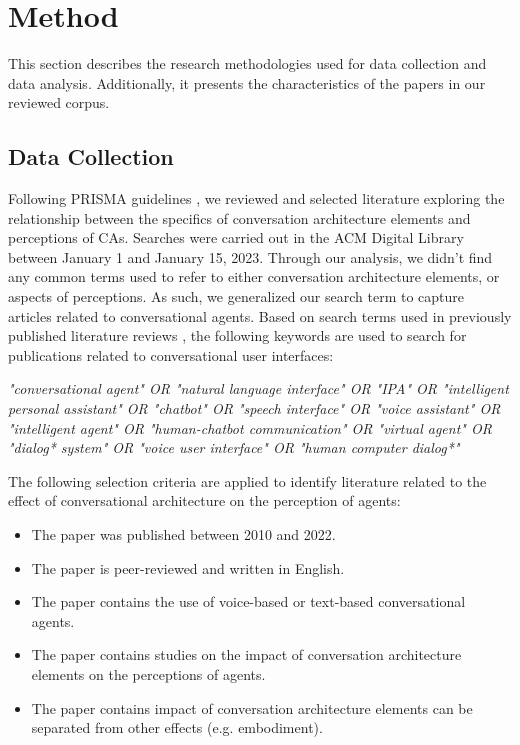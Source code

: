 
\section{Method}

This section describes the research methodologies used for data collection and data analysis. Additionally, it presents the characteristics of the papers in our reviewed corpus.

\subsection{Data Collection}

Following PRISMA guidelines \cite{prisma}, we reviewed and selected literature exploring the relationship between the specifics of conversation architecture elements and perceptions of CAs. Searches were carried out in the ACM Digital Library between January 1 and January 15, 2023. Through our analysis, we didn't find any common terms used to refer to either conversation architecture elements, or aspects of perceptions. As such, we generalized our search term to capture articles related to conversational agents. Based on search terms used in previously published literature reviews \cite{clark2019state, rapp2021human}, the following keywords are used to search for publications related to conversational user interfaces:
\newline

\textit{"conversational agent" OR "natural language interface" OR "IPA" OR "intelligent personal assistant" OR "chatbot" OR "speech interface" OR "voice assistant" OR "intelligent agent" OR "human-chatbot communication" OR "virtual agent" OR "dialog* system" OR "voice user interface" OR "human computer dialog*"}
\newline

The following selection criteria are applied to identify literature related to the effect of conversational architecture on the perception of agents:
\begin{itemize}
  \item The paper was published between 2010 and 2022.
  \item The paper is peer-reviewed and written in English.
  \item The paper contains the use of voice-based or text-based conversational agents.
  \item The paper contains studies on the impact of conversation architecture elements on the perceptions of agents.
  \item The paper contains impact of conversation architecture elements can be separated from other effects (e.g. embodiment).

\end{itemize}

